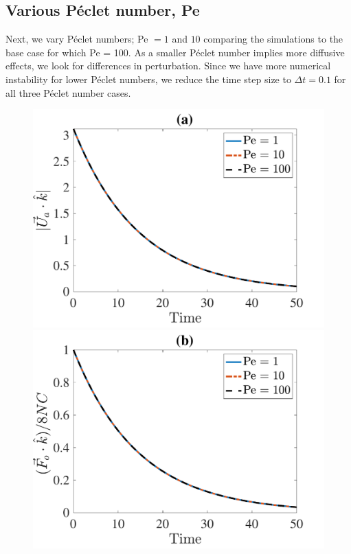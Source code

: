 \subsection{Various Péclet number, Pe}
Next, we vary Péclet numbers; Pe $=1$ and $ 10$ comparing the simulations to the base case for which Pe = 100.  As a smaller Péclet number 
implies more diffusive effects, we look for differences in perturbation. 
Since we have more numerical instability for lower Péclet numbers, we reduce the time step size to $\Delta t = 0.1$ for all three Péclet number cases.
\begin{figure}[ht]
	\begin{center}
		\includegraphics[scale=0.35]{./figures/fig_NC50_Pe_Ua3_all}
		\includegraphics[scale=0.35]{./figures/fig_NC50_Pe_Fo3_all}

\end{center}
\end{figure}
